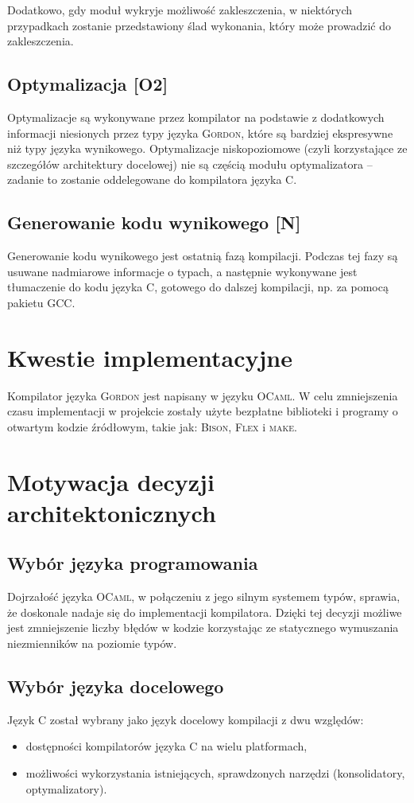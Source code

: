 \documentclass{documentation}
\begin{document}
Dodatkowo, gdy moduł wykryje możliwość zakleszczenia, w niektórych przypadkach
zostanie przedstawiony ślad wykonania, który może prowadzić do zakleszczenia. 

\subsection{Optymalizacja [O2]}
\noindent Optymalizacje są wykonywane przez kompilator na podstawie z
dodatkowych informacji niesionych przez typy języka \textsc{Gordon}, które są
bardziej ekspresywne niż typy języka wynikowego. Optymalizacje niskopoziomowe
(czyli korzystające ze szczegółów architektury docelowej) nie są częścią modułu
optymalizatora -- zadanie to zostanie oddelegowane do kompilatora języka
\textsc{C}.

\subsection{Generowanie kodu wynikowego [N]}
\noindent Generowanie kodu wynikowego jest ostatnią fazą kompilacji. Podczas tej
fazy są usuwane
nadmiarowe informacje o typach, a następnie wykonywane jest tłumaczenie do kodu języka
\textsc{C}, gotowego do dalszej kompilacji, np. za pomocą pakietu \textsc{GCC}.

\section{Kwestie implementacyjne}
\noindent Kompilator języka \textsc{Gordon} jest napisany w języku
\textsc{OCaml}. W celu zmniejszenia czasu implementacji w projekcie zostały
użyte bezpłatne biblioteki i programy o otwartym kodzie źródłowym, takie jak:
\textsc{Bison}, \textsc{Flex} i \textsc{make}.

\section{Motywacja decyzji architektonicznych}
\subsection{Wybór języka programowania}
\noindent Dojrzałość języka \textsc{OCaml}, w połączeniu z jego silnym systemem typów,
sprawia, że doskonale nadaje się do implementacji kompilatora. Dzięki tej
decyzji możliwe jest zmniejszenie liczby błędów w kodzie korzystając ze
statycznego wymuszania niezmienników na poziomie typów.

\subsection{Wybór języka docelowego}
\noindent Język \textsc{C} został wybrany jako język docelowy kompilacji z dwu względów:
\begin{itemize}
    \item dostępności kompilatorów języka \textsc{C} na wielu platformach,
    \item możliwości wykorzystania istniejących, sprawdzonych narzędzi (konsolidatory,
        optymalizatory).
\end{itemize}
\end{document}
